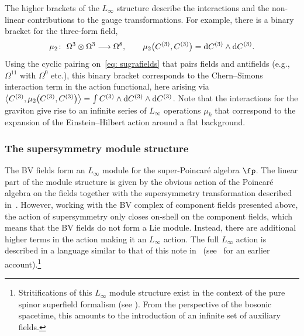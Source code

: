 \documentclass[pdftex]{sigma}
\numberwithin{equation}{section}
\theoremstyle{definition}
\def\d{{\rm d}}
\begin{document}
The higher brackets of the $L_\infty$ structure describe the interactions and the non-linear contributions to the gauge transformations. For example, there is a binary bracket for the three-form field,
\begin{equation}
 \mu_2\colon\ \Omega^3 \otimes \Omega^3 \longrightarrow \Omega^8, \qquad \mu_2\big( C^{(3)}, C^{(3)}\big) = \d C^{(3)} \wedge \d C^{(3)}.
\end{equation}
Using the cyclic pairing on~\eqref{eq: sugrafields} that pairs fields and antifields (e.g., $\Omega^{11}$ with $\Omega^0$ etc.), this binary bracket corresponds to the Chern--Simons interaction term in the action functional, here arising via $\big\langle C^{(3)} , \mu_2\big(C^{(3)}, C^{(3)}\big) \big\rangle = \int C^{(3)} \wedge \d C^{(3)} \wedge \d C^{(3)} $. Note that the interactions for the graviton give rise to an infinite series of $L_\infty$ operations $\mu_k$ that correspond to the expansion of the Einstein--Hilbert action around a flat background.

\subsubsection{The supersymmetry module structure}
The BV fields form an $L_\infty$ module for the super-Poincar\'e algebra $\fp$. The linear part of the module structure is given by the obvious action of the Poincar\'e algebra on the fields together with the supersymmetry transformation described in~\cite{CJS}. However, working with the BV complex of component fields presented above, the action of supersymmetry only closes on-shell on the component fields, which means that the BV fields do not form a Lie module. Instead, there are additional higher terms in the action making it an $L_\infty$ action. The full $L_\infty$ action is described in a language similar to that of this note in~\cite{MaxTwist} (see~\cite{BerkovitsSupermembrane} for an earlier account).\footnote{Stritifications of this $L_\infty$ module structure exist in the context of the pure spinor superfield formalism (see \cite{Ced-11d, CY2}). From the perspective of the bosonic spacetime, this amounts to the introduction of an infinite set of auxiliary fields.}
\end{document}
